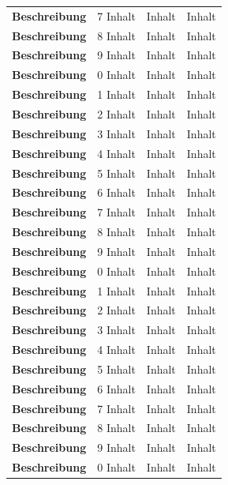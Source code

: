 \begin{longtable}{l*{3}{y}}
\bfseries Beschreibung   & 7 Inhalt & Inhalt & Inhalt \tabularnewline
\bfseries Beschreibung   & 8 Inhalt & Inhalt & Inhalt \tabularnewline
\bfseries Beschreibung   & 9 Inhalt & Inhalt & Inhalt \tabularnewline
\bfseries Beschreibung   & 0 Inhalt & Inhalt & Inhalt \tabularnewline
\bfseries Beschreibung   & 1 Inhalt & Inhalt & Inhalt \tabularnewline
\bfseries Beschreibung   & 2 Inhalt & Inhalt & Inhalt \tabularnewline
\bfseries Beschreibung   & 3 Inhalt & Inhalt & Inhalt \tabularnewline
\bfseries Beschreibung   & 4 Inhalt & Inhalt & Inhalt \tabularnewline
\bfseries Beschreibung   & 5 Inhalt & Inhalt & Inhalt \tabularnewline
\bfseries Beschreibung   & 6 Inhalt & Inhalt & Inhalt \tabularnewline
\bfseries Beschreibung   & 7 Inhalt & Inhalt & Inhalt \tabularnewline
\bfseries Beschreibung   & 8 Inhalt & Inhalt & Inhalt \tabularnewline
\bfseries Beschreibung   & 9 Inhalt & Inhalt & Inhalt \tabularnewline
\bfseries Beschreibung   & 0 Inhalt & Inhalt & Inhalt \tabularnewline
\bfseries Beschreibung   & 1 Inhalt & Inhalt & Inhalt \tabularnewline
\bfseries Beschreibung   & 2 Inhalt & Inhalt & Inhalt \tabularnewline
\bfseries Beschreibung   & 3 Inhalt & Inhalt & Inhalt \tabularnewline
\bfseries Beschreibung   & 4 Inhalt & Inhalt & Inhalt \tabularnewline
\bfseries Beschreibung   & 5 Inhalt & Inhalt & Inhalt \tabularnewline
\bfseries Beschreibung   & 6 Inhalt & Inhalt & Inhalt \tabularnewline
\bfseries Beschreibung   & 7 Inhalt & Inhalt & Inhalt \tabularnewline
\bfseries Beschreibung   & 8 Inhalt & Inhalt & Inhalt \tabularnewline
\bfseries Beschreibung   & 9 Inhalt & Inhalt & Inhalt \tabularnewline
\bfseries Beschreibung   & 0 Inhalt & Inhalt & Inhalt \tabularnewline
\end{longtable}